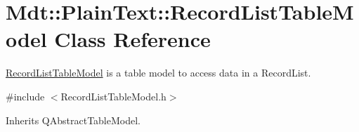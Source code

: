 \hypertarget{class_mdt_1_1_plain_text_1_1_record_list_table_model}{}\section{Mdt\+:\+:Plain\+Text\+:\+:Record\+List\+Table\+Model Class Reference}
\label{class_mdt_1_1_plain_text_1_1_record_list_table_model}


\hyperlink{class_mdt_1_1_plain_text_1_1_record_list_table_model}{Record\+List\+Table\+Model} is a table model to access data in a Record\+List.  




{\ttfamily \#include $<$Record\+List\+Table\+Model.\+h$>$}



Inherits Q\+Abstract\+Table\+Model.

